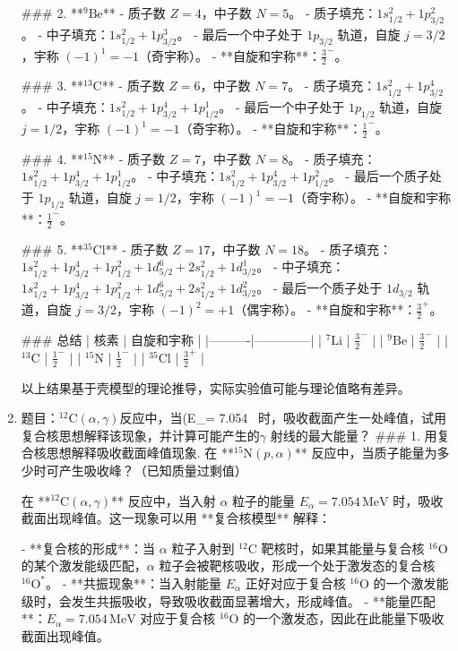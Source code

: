 \documentclass{article}
\begin{document}
\begin{enumerate}
### 2. **\(^9\text{Be}\)**
- 质子数 \(Z = 4\)，中子数 \(N = 5\)。
- 质子填充：\(1s_{1/2}^2 + 1p_{3/2}^2\)。
- 中子填充：\(1s_{1/2}^2 + 1p_{3/2}^3\)。
- 最后一个中子处于 \(1p_{3/2}\) 轨道，自旋 \(j = 3/2\)，宇称 \((-1)^1 = -1\)（奇宇称）。
- **自旋和宇称**：\(\boxed{\frac{3}{2}^-}\)。


### 3. **\(^{13}\text{C}\)**
- 质子数 \(Z = 6\)，中子数 \(N = 7\)。
- 质子填充：\(1s_{1/2}^2 + 1p_{3/2}^4\)。
- 中子填充：\(1s_{1/2}^2 + 1p_{3/2}^4 + 1p_{1/2}^1\)。
- 最后一个中子处于 \(1p_{1/2}\) 轨道，自旋 \(j = 1/2\)，宇称 \((-1)^1 = -1\)（奇宇称）。
- **自旋和宇称**：\(\boxed{\frac{1}{2}^-}\)。


### 4. **\(^{15}\text{N}\)**
- 质子数 \(Z = 7\)，中子数 \(N = 8\)。
- 质子填充：\(1s_{1/2}^2 + 1p_{3/2}^4 + 1p_{1/2}^1\)。
- 中子填充：\(1s_{1/2}^2 + 1p_{3/2}^4 + 1p_{1/2}^2\)。
- 最后一个质子处于 \(1p_{1/2}\) 轨道，自旋 \(j = 1/2\)，宇称 \((-1)^1 = -1\)（奇宇称）。
- **自旋和宇称**：\(\boxed{\frac{1}{2}^-}\)。


### 5. **\(^{35}\text{Cl}\)**
- 质子数 \(Z = 17\)，中子数 \(N = 18\)。
- 质子填充：\(1s_{1/2}^2 + 1p_{3/2}^4 + 1p_{1/2}^2 + 1d_{5/2}^6 + 2s_{1/2}^2 + 1d_{3/2}^1\)。
- 中子填充：\(1s_{1/2}^2 + 1p_{3/2}^4 + 1p_{1/2}^2 + 1d_{5/2}^6 + 2s_{1/2}^2 + 1d_{3/2}^2\)。
- 最后一个质子处于 \(1d_{3/2}\) 轨道，自旋 \(j = 3/2\)，宇称 \((-1)^2 = +1\)（偶宇称）。
- **自旋和宇称**：\(\boxed{\frac{3}{2}^+}\)。


### 总结
| 核素     | 自旋和宇称   |
|----------|--------------|
| \(^7\text{Li}\)  | \(\frac{3}{2}^-\) |
| \(^9\text{Be}\)  | \(\frac{3}{2}^-\) |
| \(^{13}\text{C}\) | \(\frac{1}{2}^-\) |
| \(^{15}\text{N}\) | \(\frac{1}{2}^-\) |
| \(^{35}\text{Cl}\) | \(\frac{3}{2}^+\) |

以上结果基于壳模型的理论推导，实际实验值可能与理论值略有差异。
\item 
题目：\(^{12}\text{C}(\alpha, \gamma)\)反应中，当(E_\alpha = 7.054 \, \)时，吸收截面产生一处峰值，试用复合核思想解释该现象，并计算可能产生的\(\gamma\) 射线的最大能量？   
### 1. 用复合核思想解释吸收截面峰值现象.
在 **\(^{15}\text{N}(p, \alpha)\)** 反应中，当质子能量为多少时可产生吸收峰？（已知质量过剩值）

在 **\(^{12}\text{C}(\alpha, \gamma)\)** 反应中，当入射 \(\alpha\) 粒子的能量 \(E_\alpha = 7.054 \, \text{MeV}\) 时，吸收截面出现峰值。这一现象可以用 **复合核模型** 解释：

- **复合核的形成**：当 \(\alpha\) 粒子入射到 \(^{12}\text{C}\) 靶核时，如果其能量与复合核 \(^{16}\text{O}\) 的某个激发能级匹配，\(\alpha\) 粒子会被靶核吸收，形成一个处于激发态的复合核 \(^{16}\text{O}^*\)。
- **共振现象**：当入射能量 \(E_\alpha\) 正好对应于复合核 \(^{16}\text{O}\) 的一个激发能级时，会发生共振吸收，导致吸收截面显著增大，形成峰值。
- **能量匹配**：\(E_\alpha = 7.054 \, \text{MeV}\) 对应于复合核 \(^{16}\text{O}\) 的一个激发态，因此在此能量下吸收截面出现峰值。


\end{enumerate}
\end{document}
